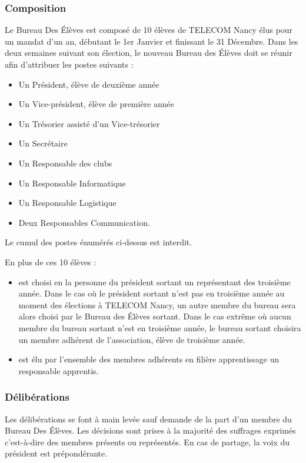 \documentclass{article} %
\begin{document}
			\subsubsection{Composition}
				Le Bureau Des Élèves est composé de 10 élèves de TELECOM Nancy élus pour un mandat d’un an, débutant le 1er Janvier et finissant le 31 Décembre.
				Dans les deux semaines suivant son élection, le nouveau Bureau des Élèves doit se réunir afin d'attribuer les postes suivants :
				\begin{itemize}
					\item Un Président, élève de deuxième année
					\item Un Vice-président, élève de première année
					\item Un Trésorier assisté d’un Vice-trésorier
					\item Un Secrétaire
					\item Un Responsable des clubs
					\item Un Responsable Informatique
					\item Un Responsable Logistique
					\item Deux Responsables Communication.
				\end{itemize}
				
				Le cumul des postes énumérés ci-dessus est interdit.

				En plus de ces 10 élèves :
				\begin{itemize}
					\item est choisi en la personne du président sortant un représentant des troisième année.
						Dans le cas où le président sortant n’est pas en troisième année au moment des élections à TELECOM Nancy, un autre membre du bureau
						sera alors choisi par le Bureau des Élèves sortant. Dans le cas extrême où aucun membre du bureau sortant n’est en troisième année,
						le bureau sortant choisira un membre adhérent de l'association, élève de troisième année.
					\item est élu par l’ensemble des membres adhérents en filière apprentissage un responsable apprentis.
				\end{itemize}

			\subsubsection{Délibérations}
				Les délibérations se font à main levée sauf demande de la part d’un membre du Bureau Des Élèves. Les décisions sont prises à la majorité des
				suffrages exprimés c’est-à-dire des membres présents ou représentés. En cas de partage, la voix du président est prépondérante.
\end{document}

